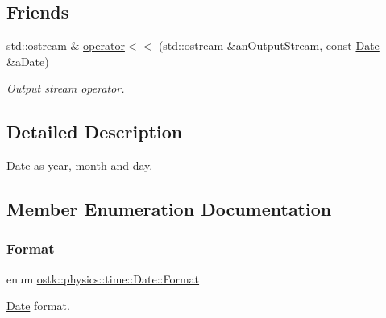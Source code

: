 \subsection*{Friends}
\begin{DoxyCompactItemize}
\item 
std\+::ostream \& \hyperlink{classostk_1_1physics_1_1time_1_1_date_a70ae98f5f6c575ec0c9bd948d12dea41}{operator$<$$<$} (std\+::ostream \&an\+Output\+Stream, const \hyperlink{classostk_1_1physics_1_1time_1_1_date}{Date} \&a\+Date)
\begin{DoxyCompactList}\small\item\em Output stream operator. \end{DoxyCompactList}\end{DoxyCompactItemize}


\subsection{Detailed Description}
\hyperlink{classostk_1_1physics_1_1time_1_1_date}{Date} as year, month and day. 

\subsection{Member Enumeration Documentation}
\mbox{\label{classostk_1_1physics_1_1time_1_1_date_a77a2e52ee3bcfd7c93139d2fe2c9a141}} 
\subsubsection{\texorpdfstring{Format}{Format}}
{\footnotesize\ttfamily enum \hyperlink{classostk_1_1physics_1_1time_1_1_date_a77a2e52ee3bcfd7c93139d2fe2c9a141}{ostk\+::physics\+::time\+::\+Date\+::\+Format}\hspace{0.3cm}{\ttfamily [strong]}}



\hyperlink{classostk_1_1physics_1_1time_1_1_date}{Date} format. 


